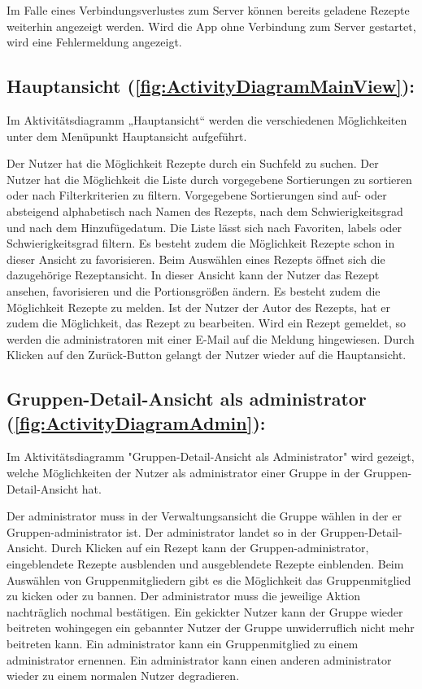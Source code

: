 \documentclass[parskip=full]{scrartcl}
\begin{document}
Im Falle eines Verbindungsverlustes zum Server können bereits geladene Rezepte weiterhin angezeigt werden. Wird die App ohne Verbindung zum Server gestartet, wird eine Fehlermeldung angezeigt.

\subsection{Hauptansicht (\autoref{fig:ActivityDiagramMainView}):}

Im Aktivitätsdiagramm „Hauptansicht“
werden die verschiedenen Möglichkeiten unter dem Menüpunkt Hauptansicht aufgeführt.


Der Nutzer hat die Möglichkeit Rezepte durch ein Suchfeld zu suchen.
Der Nutzer hat die Möglichkeit die Liste durch vorgegebene Sortierungen zu sortieren oder nach Filterkriterien zu filtern.
Vorgegebene Sortierungen sind auf- oder absteigend alphabetisch  nach Namen des Rezepts, nach dem Schwierigkeitsgrad und nach dem Hinzufügedatum.
Die Liste lässt sich nach Favoriten, \Gls{labels} oder Schwierigkeitsgrad filtern.
Es besteht zudem die Möglichkeit Rezepte schon in dieser Ansicht zu favorisieren.\newline
Beim Auswählen eines Rezepts öffnet sich die dazugehörige Rezeptansicht.
In dieser Ansicht kann der Nutzer das Rezept ansehen, favorisieren und die Portionsgrößen ändern.
Es besteht zudem die Möglichkeit Rezepte zu melden.
Ist der Nutzer der Autor des Rezepts, hat er zudem die Möglichkeit, das Rezept zu bearbeiten.
Wird ein Rezept gemeldet, so werden die \Gls{administrator}en mit einer E-Mail auf die Meldung hingewiesen.\newline
Durch Klicken auf den Zurück-Button gelangt der Nutzer wieder auf die Hauptansicht.\par


\subsection{Gruppen-Detail-Ansicht als \Gls{administrator} (\autoref{fig:ActivityDiagramAdmin}):}

Im Aktivitätsdiagramm "Gruppen-Detail-Ansicht als Administrator" wird gezeigt, welche Möglichkeiten der Nutzer als \Gls{administrator} einer Gruppe in der Gruppen-Detail-Ansicht hat.

Der \Gls{administrator} muss in der Verwaltungsansicht die Gruppe wählen in der er Gruppen-\Gls{administrator} ist.
Der \Gls{administrator} landet so in der Gruppen-Detail-Ansicht.
Durch Klicken auf ein Rezept kann der Gruppen-\Gls{administrator}, eingeblendete Rezepte \gls{ausblenden} und ausgeblendete Rezepte \gls{einblenden}.\newline
Beim Auswählen von Gruppenmitgliedern gibt es die Möglichkeit das Gruppenmitglied zu \gls{kicken} oder zu \gls{bannen}.
Der \Gls{administrator} muss die jeweilige Aktion nachträglich nochmal bestätigen.
Ein gekickter Nutzer kann der Gruppe wieder beitreten wohingegen ein gebannter Nutzer der Gruppe unwiderruflich nicht mehr beitreten kann.
Ein \Gls{administrator} kann ein Gruppenmitglied zu einem \Gls{administrator} ernennen.
Ein \Gls{administrator} kann einen anderen \Gls{administrator} wieder zu einem normalen Nutzer degradieren.
\end{document}
